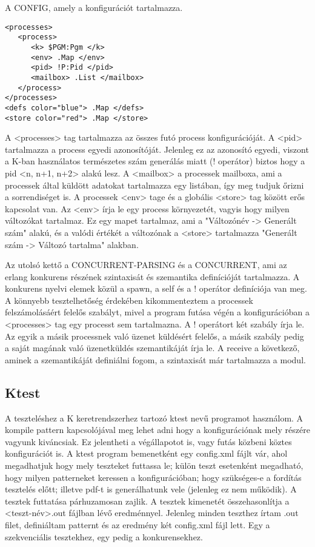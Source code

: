 \documentclass[]{article}
\begin{document}
A CONFIG, amely a konfigurációt tartalmazza.
\lstset{language=XML}
\begin{lstlisting}
<processes>
   <process>
      <k> $PGM:Pgm </k>
      <env> .Map </env>
      <pid> !P:Pid </pid>
      <mailbox> .List </mailbox>
   </process>
</processes>
<defs color="blue"> .Map </defs>
<store color="red"> .Map </store>
\end{lstlisting}

A <processes> tag tartalmazza az összes futó process konfigurációját. A <pid> tartalmazza a process egyedi azonosítóját. Jelenleg ez az azonosító egyedi, viszont a K-ban használatos természetes szám generálás miatt (! operátor) biztos hogy a pid <n, n+1, n+2> alakú lesz. A <mailbox> a processek mailboxa, ami a processek által küldött adatokat tartalmazza egy listában, így meg tudjuk őrizni a sorrendiséget is. A processek <env> tage és a globális <store> tag között erős kapcsolat van. Az <env> írja le egy process környezetét, vagyis hogy milyen változókat tartalmaz. Ez egy mapet tartalmaz, ami a "Változónév -> Generált szám" alakú, és a valódi értékét a változónak a <store> tartalmazza "Generált szám -> Változó tartalma" alakban.

Az utolsó kettő a CONCURRENT-PARSING és a CONCURRENT, ami az erlang konkurens részének szintaxisát és szemantika definícióját tartalmazza. A konkurens nyelvi elemek közül a spawn, a self és a ! operátor definíciója van meg. A könnyebb tesztelhetőség érdekében kikommenteztem a processek felszámolásáért felelős szabályt, mivel a program futása végén a konfigurációban a <processes> tag egy processt sem tartalmazna. A ! operátort két szabály írja le. Az egyik a másik processnek való üzenet küldésért felelős, a másik szabály pedig a saját magának való üzenetküldés szemantikáját írja le. A receive a következő, aminek a szemantikáját definiálni fogom, a szintaxisát már tartalmazza a modul.

\subsection*{Ktest}
A teszteléshez a K keretrendszerhez tartozó ktest nevű programot használom. A kompile pattern kapcsolójával meg lehet adni hogy a konfigurációnak mely részére vagyunk kiváncsiak. Ez jelentheti a végállapotot is, vagy futás közbeni köztes konfigurációt is. A ktest program bemenetként egy config.xml fájlt vár, ahol megadhatjuk hogy mely teszteket futtassa le; külön teszt esetenként megadható, hogy milyen patterneket keressen a konfigurációban; hogy szükséges-e a fordítás tesztelés előtt; illetve pdf-t is generálhatunk vele (jelenleg ez nem működik). A tesztek futtatása párhuzamosan zajlik. A tesztek kimenetét összehasonlítja a <teszt-név>.out fájlban lévő eredménnyel. Jelenleg minden teszthez írtam .out filet, definiáltam patternt és az eredmény két config.xml fájl lett. Egy a szekvenciális tesztekhez, egy pedig a konkurensekhez.
\end{document}
